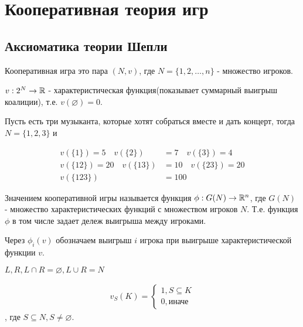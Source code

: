 \documentclass[../main.tex]{subfiles}
\begin{document}
\section{Кооперативная теория игр}

\subsection{Аксиоматика теории Шепли}

\begin{df}
	Кооперативная игра это пара $(N, v)$, где  $N = \{1, 2, \ldots, n\}$ - множество игроков.

	 $v : 2^{N} \to \mathbb{R}$ - характеристическая функция(показывает суммарный выигрыш коалиции), т.е. $v(\varnothing) = 0$.
\end{df}

\begin{exmpl}
	Пусть есть три музыканта, которые хотят собраться вместе и дать концерт, тогда $N = \{1, 2, 3\}$ и 

	\begin{align*}
		v(\{1\}) = 5 \quad v(\{2\}) &= 7 \quad v(\{3\}) = 4 \\
		v(\{12\}) = 20 \quad v(\{13\}) &= 10 \quad v(\{23\}) = 20 \\
		v(\{123\}) &= 100
	\end{align*}

\end{exmpl}

\begin{df}
	Значением кооперативной игры называется функция $\phi : G(N) \to \mathbb{R}^{n}$, где $G(N)$ - множество характеристических функций с множеством игроков  $N$.
	Т.е. функция $\phi$ в том числе задает дележ выигрыша между игроками.

	Через $\phi_i(v)$ обозначаем выигрыш  $i$ игрока при выигрыше  характеристической функции $v$.
\end{df}

\begin{exmpl}[Парам]
	$L, R, L \cap R = \varnothing, L \cup R = N$ 

\end{exmpl}

\begin{df} \label{definition:unaminity_game}
	\begin{align*}
		v_S(K) = \begin{cases}
			1, S \subseteq K \\
			0, \text{иначе}
		\end{cases}
	\end{align*},
	где $S \subseteq N, S \neq \varnothing$.
\end{df}
\end{document}
